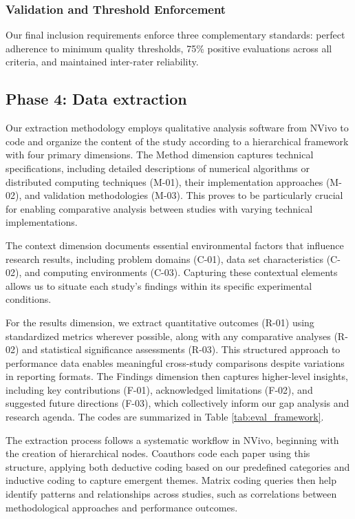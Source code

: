 \documentclass[acmsmall]{acmart}
\begin{document}
\subsubsection{Validation and Threshold Enforcement}\label{subsubsec:phase-3-quality-assessment:validation-and-threshold-enforcement}

Our final inclusion requirements enforce three complementary standards: perfect adherence to minimum quality thresholds, 75\% positive evaluations across all criteria, and maintained inter-rater reliability.

\subsection{Phase 4: Data extraction}\label{subsec:phase-4-data-extraction}
Our extraction methodology employs qualitative analysis software from NVivo \citep{kitchenham2007guidelines} to code and organize the content of the study according to a hierarchical framework with four primary dimensions. The Method dimension captures technical specifications, including detailed descriptions of numerical algorithms or distributed computing techniques (M-01), their implementation approaches (M-02), and validation methodologies (M-03). This proves to be particularly crucial for enabling comparative analysis between studies with varying technical implementations.

The context dimension documents essential environmental factors that influence research results, including problem domains (C-01), data set characteristics (C-02), and computing environments (C-03). Capturing these contextual elements allows us to situate each study's findings within its specific experimental conditions.

For the results dimension, we extract quantitative outcomes (R-01) using standardized metrics wherever possible, along with any comparative analyses (R-02) and statistical significance assessments (R-03). This structured approach to performance data enables meaningful cross-study comparisons despite variations in reporting formats. The Findings dimension then captures higher-level insights, including key contributions (F-01), acknowledged limitations (F-02), and suggested future directions (F-03), which collectively inform our gap analysis and research agenda. The codes are summarized in Table \cref{tab:eval_framework}.

The extraction process follows a systematic workflow in NVivo, beginning with the creation of hierarchical nodes. Coauthors code each paper using this structure, applying both deductive coding based on our predefined categories and inductive coding to capture emergent themes. Matrix coding queries then help identify patterns and relationships across studies, such as correlations between methodological approaches and performance outcomes.
\end{document}
